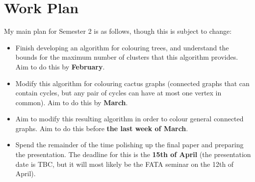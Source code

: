 \documentclass{mprop}
\begin{document}
\section{Work Plan}

My main plan for Semester 2 is as follows, though this is subject to change:

\begin{itemize}
    \item Finish developing an algorithm for colouring trees, and understand the bounds for the maximum number of clusters that this algorithm provides. Aim to do this by \textbf{February}.
    \item Modify this algorithm for colouring cactus graphs (connected graphs that can contain cycles, but any pair of cycles can have at most one vertex in common). Aim to do this by \textbf{March}.
    \item Aim to modify this resulting algorithm in order to colour general connected graphs. Aim to do this before \textbf{the last week of March}.
    \item Spend the remainder of the time polishing up the final paper and preparing the presentation. The deadline for this is the \textbf{15th of April} (the presentation date is TBC, but it will most likely be the FATA seminar on the 12th of April).
\end{itemize}



\end{document}
